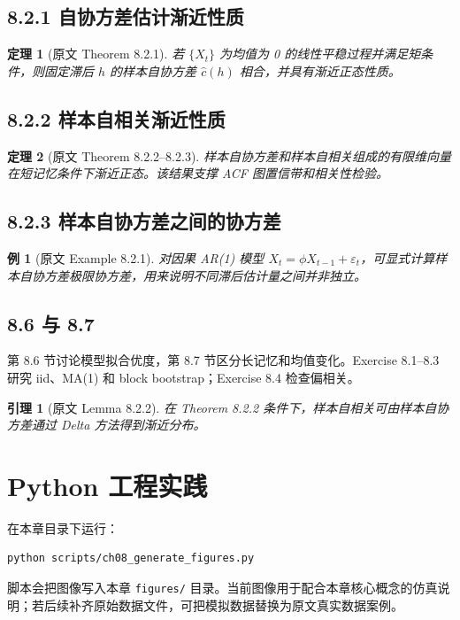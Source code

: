 \documentclass[11pt,a4paper]{ctexart}
\newtheorem{theorem}{定理}[section]
\newtheorem{lemma}{引理}[section]
\newtheorem{example}{例}[section]
\begin{document}
\subsection{8.2.1 自协方差估计渐近性质}
\begin{theorem}[原文 Theorem 8.2.1]
若 \(\{X_t\}\) 为均值为 0 的线性平稳过程并满足矩条件，则固定滞后 \(h\) 的样本自协方差 \(\hat c(h)\) 相合，并具有渐近正态性质。
\end{theorem}

\subsection{8.2.2 样本自相关渐近性质}
\begin{theorem}[原文 Theorem 8.2.2--8.2.3]
样本自协方差和样本自相关组成的有限维向量在短记忆条件下渐近正态。该结果支撑 ACF 图置信带和相关性检验。
\end{theorem}

\subsection{8.2.3 样本自协方差之间的协方差}
\begin{example}[原文 Example 8.2.1]
对因果 AR(1) 模型 \(X_t=\phi X_{t-1}+\varepsilon_t\)，可显式计算样本自协方差极限协方差，用来说明不同滞后估计量之间并非独立。
\end{example}

\subsection{8.6 与 8.7}
第 8.6 节讨论模型拟合优度，第 8.7 节区分长记忆和均值变化。Exercise 8.1--8.3 研究 iid、MA(1) 和 block bootstrap；Exercise 8.4 检查偏相关。

\begin{lemma}[原文 Lemma 8.2.2]
在 Theorem 8.2.2 条件下，样本自相关可由样本自协方差通过 Delta 方法得到渐近分布。
\end{lemma}

\section{Python 工程实践}

在本章目录下运行：
\begin{lstlisting}[language=bash]
python scripts/ch08_generate_figures.py
\end{lstlisting}

脚本会把图像写入本章 \texttt{figures/} 目录。当前图像用于配合本章核心概念的仿真说明；若后续补齐原始数据文件，可把模拟数据替换为原文真实数据案例。
\end{document}
